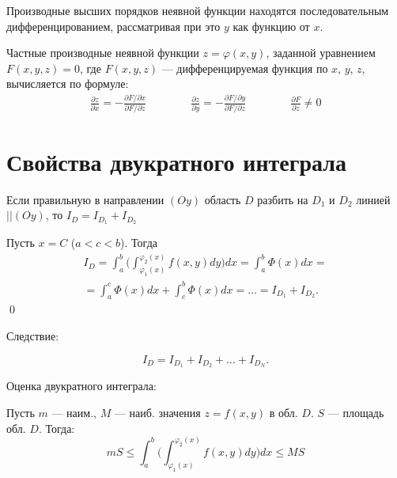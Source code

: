 \documentclass[a4paper,12pt,oneside]{extbook}
\theoremstyle{numbered}
\theoremstyle{unnumbered}
\theoremstyle{named}
\theoremstyle{unnumbered}
\theoremstyle{named}
\theoremstyle{named}
\theoremstyle{named}
\renewenvironment{proof}{{\noindent\textbf{Доказательство.}}}{\qed}
\begin{document}
Производные высших порядков неявной функции находятся последовательным дифференцированием, рассматривая при это \(y\) как функцию от \(x\).

Частные производные неявной функции \(z = \varphi(x, y)\), заданной уравнением \(F(x, y, z) = 0\), где \(F(x, y, z)\) — дифференцируемая функция по \(x\), \(y\), \(z\), вычисляется по формуле:
\begin{gather*}
    \frac{\partial z}{\partial x} = -\frac{\partial F / \partial x}{\partial F / \partial z}
    \qquad \qquad
    \frac{\partial z}{\partial y} = -\frac{\partial F / \partial y}{\partial F / \partial z}
    \qquad \qquad
    \frac{\partial F}{\partial z} \neq 0
\end{gather*}

\section{Свойства двукратного интеграла}%
\label{sec:Свойства двукратного интеграла}

\begin{siderules}
    Если правильную в направлении \((Oy)\) область \(D\) разбить на \(D_1\) и \(D_2\) линией \(|| (Oy)\), то \(I_D = I_{D_1} + I_{D_2}\)
\end{siderules}

\begin{proof}
    Пусть \(x = C\) (\(a < c < b\)). Тогда
    \begin{equation}
        \begin{gathered}
            I_D = \int_a^b \Big( \int_{\varphi_1(x)}^{\varphi_2(x)} f(x, y)dy \Big)dx = \int_a^b \Phi(x)dx = \\ =
            \int_a^c \Phi(x)dx + \int_c^b \Phi(x)dx =
            \ldots =
            I_{D_1} + I_{D_2}.
        \end{gathered}
    \end{equation}
\end{proof}

Следствие:
\begin{siderules}
    \begin{equation}
        I_D = I_{D_1} + I_{D_2} + \ldots + I_{D_N}.
    \end{equation}
\end{siderules}

Оценка двукратного интеграла:
\begin{siderules}
    Пусть \(m\) — наим., \(M\) — наиб. значения \(z = f(x, y)\) в обл. \(D\). \(S\) — площадь обл. \(D\). Тогда:
    \begin{equation}
        mS \leq \int_a^b \Big( \int_{\varphi_1(x)}^{\varphi_2(x)} f(x, y)dy \Big)dx \leq MS
    \end{equation}
\end{siderules}
\end{document}
